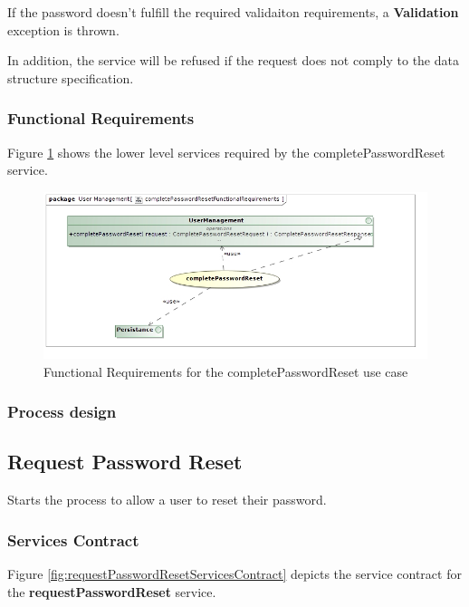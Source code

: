 If the password doesn't fulfill the required validaiton requirements, a \textbf{Validation} exception is thrown.

In addition, the service will be refused if the request does not comply to the data structure specification.

\subsubsection{Functional Requirements}
Figure \ref{fig:completePasswordResetFunctionalRequirements} shows the lower
level services required by the completePasswordReset service.

\begin{figure}[H]
	\begin{center}
		\includegraphics[scale=0.55]{../Diagrams and Charts/Users/completePasswordResetFunctionalRequirements.jpg}
		\caption{Functional Requirements for the completePasswordReset use case}
		\label{fig:completePasswordResetFunctionalRequirements}
	\end{center}
\end{figure}

\subsubsection{Process design}

\subsection{Request Password Reset}
Starts the process to allow a user to reset their password.

\subsubsection{Services Contract}
Figure \ref{fig:requestPasswordResetServicesContract} depicts the service contract for the \textbf{requestPasswordReset} service.

